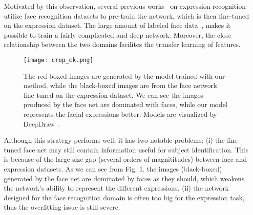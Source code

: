 \documentclass[a4paper, 10pt, conference]{ieeeconf}      %
\begin{document}
Motivated by this observation, several previous works~\cite{levi2015emotion, zhao2016peak} on expression recognition utilize face recognition datasets to pre-train the network, which is then fine-tuned on the expression dataset.  
The large amount of labeled face data~\cite{kemelmacher2015megaface, yi2014learning}, makes it possible to train a fairly complicated and deep network. Moreover, the close relationship between the two domains facilites the transfer learning of features.

\begin{figure}[!ht]
  \centering
    \texttt{[image: crop\_ck.png]}
  \caption{The red-boxed images are generated by the model trained with our method, while the black-boxed images are from the face network fine-tuned on the expression dataset. We can see the images produced by the face net are dominated with faces, while our model represents the facial expressions better. Models are visualized by DeepDraw~\cite{deepdraw}. }
  \label{figurelabel}
  \vspace{-2mm}
\end{figure}


Although this strategy performs well, it has two notable problems: (i) the fine-tuned face net may still contain information useful for subject identification. This is because of the large size gap (several orders of magnititudes) between face and expression datasets.
As we can see from Fig. 1, the images (black-boxed) generated by the face net are dominated by faces as they should, which weakens the network's ability to represent the different expressions. 
(ii) the network designed for the face recognition domain is often too big for the expression task, thus the overfitting issue is still severe. 
\end{document}
